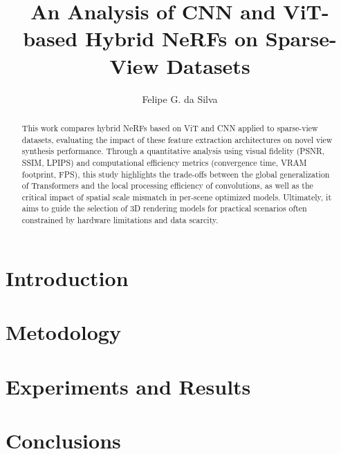 \documentclass[12pt]{article}
\title{An Analysis of CNN and ViT-based Hybrid NeRFs on Sparse-View Datasets}
\author{Felipe G. da Silva\inst{1}}
\begin{document}
 

\maketitle

\begin{abstract}
   This work compares hybrid NeRFs based on ViT and CNN applied to sparse-view datasets, evaluating the impact of these feature extraction architectures on novel view synthesis performance. Through a quantitative analysis using visual fidelity (PSNR, SSIM, LPIPS) and computational efficiency metrics (convergence time, VRAM footprint, FPS), this study highlights the trade-offs between the global generalization of Transformers and the local processing efficiency of convolutions, as well as the critical impact of spatial scale mismatch in per-scene optimized models. Ultimately, it aims to guide the selection of 3D rendering models for practical scenarios often constrained by hardware limitations and data scarcity.
\end{abstract}

\section{Introduction}

\section{Metodology} 
\label{sec:metodology}

\section{Experiments and Results}


\section{Conclusions}





\end{document}
